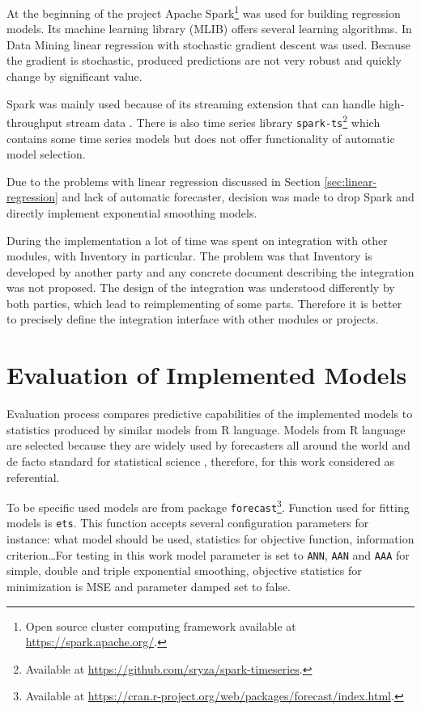     At the beginning of the project Apache Spark\footnote{Open source cluster computing framework available at
    \url{https://spark.apache.org/}.} was used for building regression models. Its machine learning library (MLIB)
    offers several learning algorithms. In Data Mining linear regression with stochastic gradient descent was used.
    Because the gradient is stochastic, produced predictions are not very robust and quickly change by significant
    value.

    Spark was mainly used because of its streaming extension that can handle
    high-throughput stream data \cite{apache-spark}. There is also time series library
    \texttt{spark-ts}\footnote{Available at \url{https://github.com/sryza/spark-timeseries}.} which contains some
    time series models but does not offer functionality of automatic model selection.

    Due to the problems with linear regression discussed in Section \ref{sec:linear-regression} and lack of automatic
    forecaster, decision was made to drop Spark and directly implement exponential smoothing models.

    During the implementation a lot of time was spent on integration with other modules, with Inventory in particular.
    The problem was that Inventory is developed by another party and any concrete document
    describing the integration was not proposed. The design of the integration was understood differently
    by both parties, which lead to reimplementing of some parts. Therefore it is better to precisely define the
    integration interface with other modules or projects.

\chapter{Evaluation of Implemented Models} \label{chap:evaluation}
Evaluation process compares predictive capabilities of the implemented models to statistics produced by similar models
from R language. Models from R language are selected because they are widely used by forecasters all around the
world and de facto standard for statistical science \cite{kleiber2008applied}, therefore, for this work considered
as referential.

To be specific used models are from package
\texttt{forecast}\footnote{Available at \url{https://cran.r-project.org/web/packages/forecast/index.html}.}.
Function used for fitting models is \texttt{ets}. This function accepts several configuration parameters for instance:
what model should be used, statistics for objective function, information criterion\dots For testing in this work model
parameter is set to \texttt{ANN}, \texttt{AAN} and \texttt{AAA} for simple, double and triple exponential smoothing,
objective statistics for minimization is MSE and parameter damped set to false.

